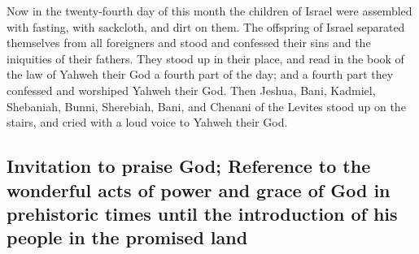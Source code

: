  Now in the twenty-fourth day of this month the children
of Israel were assembled with fasting, with sackcloth, and dirt on them.
 The offspring of Israel separated themselves from all
foreigners and stood and confessed their sins and the iniquities of
their fathers.  They stood up in their place, and read in
the book of the law of Yahweh their God a fourth part of the day; and a
fourth part they confessed and worshiped Yahweh their God.
 Then Jeshua, Bani, Kadmiel, Shebaniah, Bunni, Sherebiah,
Bani, and Chenani of the Levites stood up on the stairs, and cried with
a loud voice to Yahweh their God.

\hypertarget{invitation-to-praise-god-reference-to-the-wonderful-acts-of-power-and-grace-of-god-in-prehistoric-times-until-the-introduction-of-his-people-in-the-promised-land}{%
\subsection{Invitation to praise God; Reference to the wonderful acts of
power and grace of God in prehistoric times until the introduction of
his people in the promised
land}\label{invitation-to-praise-god-reference-to-the-wonderful-acts-of-power-and-grace-of-god-in-prehistoric-times-until-the-introduction-of-his-people-in-the-promised-land}}

